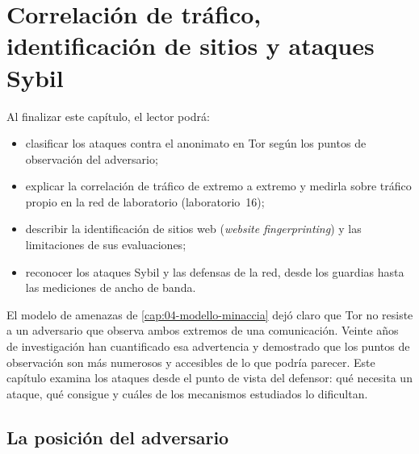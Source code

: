\chapter{Correlación de tráfico, identificación de sitios y ataques Sybil}\label{cap:26-attacchi}

\begin{obiettivi}
Al finalizar este capítulo, el lector podrá:
\begin{itemize}[nosep]
  \item clasificar los ataques contra el anonimato en Tor según los puntos de observación del adversario;
  \item explicar la correlación de tráfico de extremo a extremo y medirla sobre tráfico propio en la red de laboratorio (laboratorio~16);
  \item describir la identificación de sitios web (\emph{website fingerprinting}) y las limitaciones de sus evaluaciones;
  \item reconocer los ataques Sybil y las defensas de la red, desde los guardias hasta las mediciones de ancho de banda.
\end{itemize}
\end{obiettivi}

El modelo de amenazas de \cref{cap:04-modello-minaccia} dejó claro que Tor no resiste a un adversario que observa ambos extremos de una comunicación. Veinte años de investigación han cuantificado esa advertencia y demostrado que los puntos de observación son más numerosos y accesibles de lo que podría parecer. Este capítulo examina los ataques desde el punto de vista del defensor: qué necesita un ataque, qué consigue y cuáles de los mecanismos estudiados lo dificultan.

\section{La posición del adversario}\label{sec:att-posizioni}

